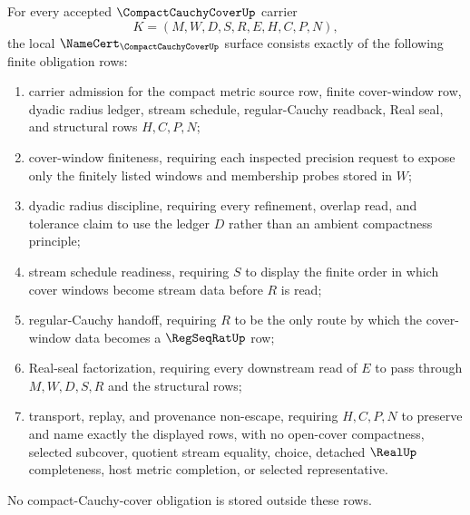 \begin{theorem}
\label{thm:compact-cauchy-cover-namecert-obligations}
For every accepted $\CompactCauchyCoverUp$ carrier
$$
K=(M,W,D,S,R,E,H,C,P,N),
$$
the local $\NameCert_{\CompactCauchyCoverUp}$ surface consists exactly of the following finite obligation rows:
\begin{enumerate}
\item carrier admission for the compact metric source row, finite cover-window row, dyadic radius ledger, stream schedule, regular-Cauchy readback, Real seal, and structural rows $H,C,P,N$;
\item cover-window finiteness, requiring each inspected precision request to expose only the finitely listed windows and membership probes stored in $W$;
\item dyadic radius discipline, requiring every refinement, overlap read, and tolerance claim to use the ledger $D$ rather than an ambient compactness principle;
\item stream schedule readiness, requiring $S$ to display the finite order in which cover windows become stream data before $R$ is read;
\item regular-Cauchy handoff, requiring $R$ to be the only route by which the cover-window data becomes a $\RegSeqRatUp$ row;
\item Real-seal factorization, requiring every downstream read of $E$ to pass through $M,W,D,S,R$ and the structural rows;
\item transport, replay, and provenance non-escape, requiring $H,C,P,N$ to preserve and name exactly the displayed rows, with no open-cover compactness, selected subcover, quotient stream equality, choice, detached $\RealUp$ completeness, host metric completion, or selected representative.
\end{enumerate}
No compact-Cauchy-cover obligation is stored outside these rows.
\end{theorem}
